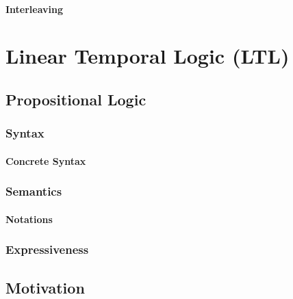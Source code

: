 \documentclass[a4paper, 11pt, accentcolor = tud3b]{tudreport}
\begin{document}
                \subsubsection{Interleaving} %

    \chapter{Linear Temporal Logic (LTL)} %

        \section{Propositional Logic} %

            \subsection{Syntax} %

                \subsubsection{Concrete Syntax} %

            \subsection{Semantics} %

                \subsubsection{Notations} %

            \subsection{Expressiveness} %

        \section{Motivation} %
\end{document}
